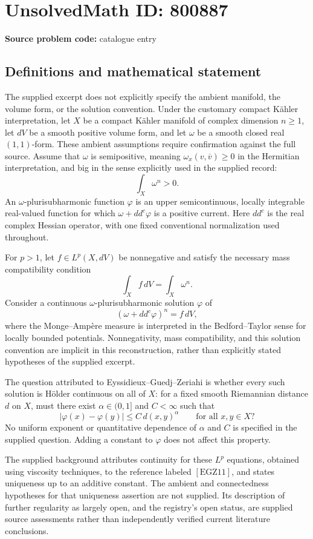 \documentclass[11pt]{article}
\begin{document}
\section*{UnsolvedMath ID: 800887}
\textbf{Source problem code:} catalogue entry
\subsection{Definitions and mathematical statement}
The supplied excerpt does not explicitly specify the ambient manifold, the volume form, or the solution convention. Under the customary compact K\"ahler interpretation, let \(X\) be a compact K\"ahler manifold of complex dimension \(n\geq 1\), let \(dV\) be a smooth positive volume form, and let \(\omega\) be a smooth closed real \((1,1)\)-form. These ambient assumptions require confirmation against the full source. Assume that \(\omega\) is semipositive, meaning \(\omega_x(v,\overline v)\geq 0\) in the Hermitian interpretation, and big in the sense explicitly used in the supplied record:
\[
\int_X\omega^n>0.
\]
An \(\omega\)-plurisubharmonic function \(\varphi\) is an upper semicontinuous, locally integrable real-valued function for which \(\omega+dd^c\varphi\) is a positive current. Here \(dd^c\) is the real complex Hessian operator, with one fixed conventional normalization used throughout.

For \(p>1\), let \(f\in L^p(X,dV)\) be nonnegative and satisfy the necessary mass compatibility condition
\[
\int_X f\,dV=\int_X\omega^n.
\]
Consider a continuous \(\omega\)-plurisubharmonic solution \(\varphi\) of
\[
(\omega+dd^c\varphi)^n=f\,dV,
\]
where the Monge--Amp\`ere measure is interpreted in the Bedford--Taylor sense for locally bounded potentials. Nonnegativity, mass compatibility, and this solution convention are implicit in this reconstruction, rather than explicitly stated hypotheses of the supplied excerpt.

The question attributed to Eyssidieux--Guedj--Zeriahi is whether every such solution is H\"older continuous on all of \(X\): for a fixed smooth Riemannian distance \(d\) on \(X\), must there exist \(\alpha\in(0,1]\) and \(C<\infty\) such that
\[
|\varphi(x)-\varphi(y)|\leq C\,d(x,y)^\alpha
\qquad\text{for all }x,y\in X?
\]
No uniform exponent or quantitative dependence of \(\alpha\) and \(C\) is specified in the supplied question. Adding a constant to \(\varphi\) does not affect this property.

The supplied background attributes continuity for these \(L^p\) equations, obtained using viscosity techniques, to the reference labeled \([\mathrm{EGZ11}]\), and states uniqueness up to an additive constant. The ambient and connectedness hypotheses for that uniqueness assertion are not supplied. Its description of further regularity as largely open, and the registry's open status, are supplied source assessments rather than independently verified current literature conclusions.
\end{document}

